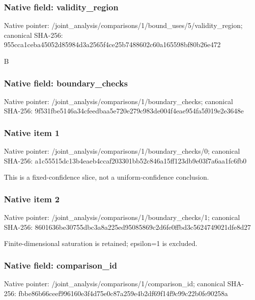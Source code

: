 \documentclass[10pt,a4paper]{article}
\begin{document}
\subsubsection{Native field: validity\_\allowbreak{}region}
Native pointer: /joint\_\allowbreak{}analysis/comparisons/1/bound\_\allowbreak{}uses/5/validity\_\allowbreak{}region; canonical SHA-256: 955cca1ceba45052d85984d3a2565f4ce25b7488602c60a165598bf80b26e472

\begingroup\raggedright\sloppy B\par\endgroup

\subsubsection{Native field: boundary\_\allowbreak{}checks}
Native pointer: /joint\_\allowbreak{}analysis/comparisons/1/boundary\_\allowbreak{}checks; canonical SHA-256: 9f531fbe5146a34cfeedbaa5e720e279c983de004f4eae954fa5f019e2e3648e

\subsubsection{Native item 1}
Native pointer: /joint\_\allowbreak{}analysis/comparisons/1/boundary\_\allowbreak{}checks/0; canonical SHA-256: a1c55515dc13b4eaeb4ccaf203301bb52c846a15ff123db9e03f7a6aa1fc6fb0

\begingroup\raggedright\sloppy This is a fixed-confidence slice,\allowbreak{} not a uniform-confidence conclusion.\par\endgroup

\subsubsection{Native item 2}
Native pointer: /joint\_\allowbreak{}analysis/comparisons/1/boundary\_\allowbreak{}checks/1; canonical SHA-256: 8601636be30755dbc3a8a225ed95085869c2d6fe0ffbd3c5624749021dfe8d27

\begingroup\raggedright\sloppy Finite-dimensional saturation is retained;\allowbreak{} epsilon=\allowbreak{}1 is excluded.\par\endgroup

\subsubsection{Native field: comparison\_\allowbreak{}id}
Native pointer: /joint\_\allowbreak{}analysis/comparisons/1/comparison\_\allowbreak{}id; canonical SHA-256: fbbe86b66ceef996160e3f4d75e0c87a259e4b2df69f14f9c99c22b0fe90258a
\end{document}
